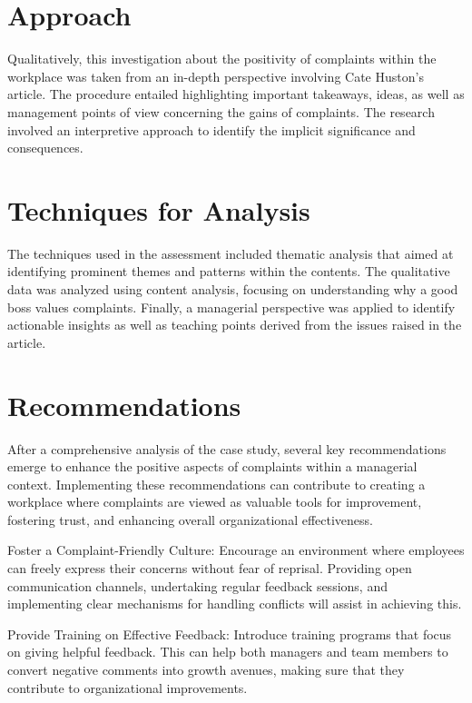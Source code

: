 \documentclass[a4paper,12pt]{report}
\begin{document}
\section{Approach}
\begin{enumerate}
Qualitatively, this investigation about the positivity of complaints within the workplace was taken from an in-depth perspective involving Cate Huston’s article. The procedure entailed highlighting important takeaways, ideas, as well as management points of view concerning the gains of complaints. The research involved an interpretive approach to identify the implicit significance and consequences.  
\end{enumerate}


\section{Techniques for Analysis}
\begin{enumerate}
The techniques used in the assessment included thematic analysis that aimed at identifying prominent themes and patterns within the contents. The qualitative data was analyzed using content analysis, focusing on understanding why a good boss values complaints. Finally, a managerial perspective was applied to identify actionable insights as well as teaching points derived from the issues raised in the article.
\end{enumerate}


\section{Recommendations}

After a comprehensive analysis of the case study, several key recommendations emerge to enhance the positive aspects of complaints within a managerial context. Implementing these recommendations can contribute to creating a workplace where complaints are viewed as valuable tools for improvement, fostering trust, and enhancing overall organizational effectiveness.

Foster a Complaint-Friendly Culture:
Encourage an environment where employees can freely express their concerns without fear of reprisal. Providing open communication channels, undertaking regular feedback sessions, and implementing clear mechanisms for handling conflicts will assist in achieving this.

Provide Training on Effective Feedback:
Introduce training programs that focus on giving helpful feedback. This can help both managers and team members to convert negative comments into growth avenues, making sure that they contribute to organizational improvements.
\end{document}
